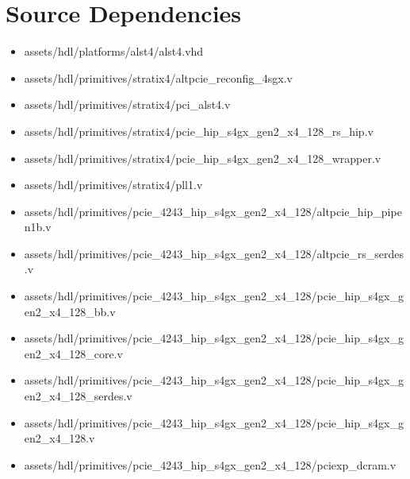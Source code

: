 \section*{Source Dependencies}
\begin{itemize}
	\item
assets/hdl/platforms/alst4/alst4.vhd
	\item
assets/hdl/primitives/stratix4/altpcie\_reconfig\_4sgx.v
	\item
assets/hdl/primitives/stratix4/pci\_alst4.v
	\item
assets/hdl/primitives/stratix4/pcie\_hip\_s4gx\_gen2\_x4\_128\_rs\_hip.v
	\item
assets/hdl/primitives/stratix4/pcie\_hip\_s4gx\_gen2\_x4\_128\_wrapper.v
	\item
assets/hdl/primitives/stratix4/pll1.v
	\item
assets/hdl/primitives/pcie\_4243\_hip\_s4gx\_gen2\_x4\_128/altpcie\_hip\_pipen1b.v
	\item
assets/hdl/primitives/pcie\_4243\_hip\_s4gx\_gen2\_x4\_128/altpcie\_rs\_serdes.v
	\item
assets/hdl/primitives/pcie\_4243\_hip\_s4gx\_gen2\_x4\_128/pcie\_hip\_s4gx\_gen2\_x4\_128\_bb.v
	\item
assets/hdl/primitives/pcie\_4243\_hip\_s4gx\_gen2\_x4\_128/pcie\_hip\_s4gx\_gen2\_x4\_128\_core.v
	\item
assets/hdl/primitives/pcie\_4243\_hip\_s4gx\_gen2\_x4\_128/pcie\_hip\_s4gx\_gen2\_x4\_128\_serdes.v
	\item
assets/hdl/primitives/pcie\_4243\_hip\_s4gx\_gen2\_x4\_128/pcie\_hip\_s4gx\_gen2\_x4\_128.v
	\item
assets/hdl/primitives/pcie\_4243\_hip\_s4gx\_gen2\_x4\_128/pciexp\_dcram.v
\end{itemize}

